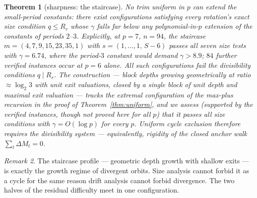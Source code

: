 \documentclass[11pt]{article}
\newtheorem{theorem}{Theorem}[section]
\theoremstyle{remark}
\newtheorem{remark}[theorem]{Remark}
\newcommand{\LL}{\log_2 3}
\begin{document}
\begin{theorem}[sharpness: the staircase]\label{thm:staircase}
No trim uniform in $p$ can extend the small-period constants: there exist configurations satisfying every rotation's exact size condition $q \le R_r$ whose $\gamma$ falls far below any polynomial-in-$p$ extension of the constants of periods $2$--$3$. Explicitly, at $p=7$, $n=94$, the staircase $m = (4,7,9,15,23,35,1)$ with $s = (1,\dots,1,\,S-6)$ passes all seven size tests with $\gamma = 6.74$, where the period-$3$ constant would demand $\gamma > 8.9$; $84$ further verified instances occur at $p=6$ alone. All such configurations fail the divisibility conditions $q \mid R_r$. The construction --- block depths growing geometrically at ratio $\approx\LL$ with unit exit valuations, closed by a single block of unit depth and maximal exit valuation --- tracks the extremal configuration of the max-plus recursion in the proof of Theorem~\ref{thm:uniform}, and we assess (supported by the verified instances, though not proved here for all $p$) that it passes all size conditions with $\gamma = O(\log p)$ for every $p$. Uniform cycle exclusion therefore requires the divisibility system --- equivalently, rigidity of the closed anchor walk $\sum_t \Delta M_t = 0$.
\end{theorem}

\begin{remark}\label{rem:staircase}
The staircase profile --- geometric depth growth with shallow exits --- is exactly the growth regime of divergent orbits. Size analysis cannot forbid it as a cycle for the same reason drift analysis cannot forbid divergence. The two halves of the residual difficulty meet in one configuration.
\end{remark}
\end{document}
